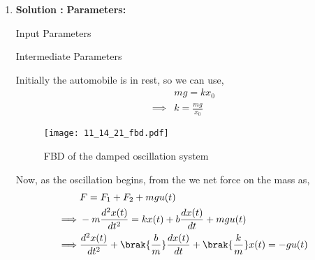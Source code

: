 \documentclass[journal,12pt,twocolumn]{IEEEtran}
\theoremstyle{remark}
\begin{document}
\begin{enumerate}
    \item \textbf{Solution :}
    \textbf{Parameters:}
    \begin{table}[htbp]
        \centering
        
        \vspace{5pt}
        \caption{Input Parameters}
        \label{tab:Table 1}
    \end{table}
    \begin{table}[htbp]
        \centering
        
        \vspace{5pt}
        \caption{Intermediate Parameters}
        \label{tab:Table 2}
    \end{table}
    
    \vspace{15pt}
    


    Initially the automobile is in rest, so we can use,
    \begin{align}
        &mg = kx_0 \label{eq:1}\\
        \implies &k=\frac{mg}{x_0} \label{eq:2}
    \end{align}

    \begin{figure}[h]
        \centering
        \texttt{[image: 11\_14\_21\_fbd.pdf]}
        \caption{FBD of the damped oscillation system}
        \label{fig:Fig-1}
    \end{figure}

    Now, as the oscillation begins, from the  we net force on the mass as,
    \begin{align}
        &F=F_{1}+F_{2}+mgu(t) \label{eq:3}\\
        \implies &-m\frac{d^2x(t)}{dt^2}=kx(t)+b\frac{dx(t)}{dt}+mgu(t) \label{eq:4}\\
        \implies &\frac{d^2x(t)}{dt^2}+\brak{\frac{b}{m}}\frac{dx(t)}{dt}+\brak{\frac{k}{m}}x(t)=-gu(t) \label{eq:5}
    \end{align}


\end{enumerate}
\end{document}
